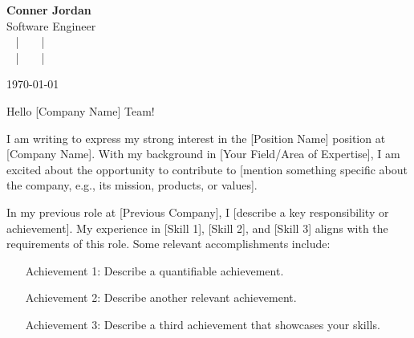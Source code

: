 \documentclass[letterpaper,11pt]{article}
\begin{document}
\begin{center}
  {\Huge \textbf{Conner Jordan}}\\[4pt]
  {\Large Software Engineer}\\[4pt]
  \href{tel:+18059759793}{
    \raisebox{-0.05\height}{\faPhone\ +1 (805) 975-9793}} ~ | ~
  \href{mailto:connercharlesjordan@gmail.com}{
    \raisebox{-0.15\height}{\faEnvelope\ connercharlesjordan@gmail.com}} ~ | ~
  \raisebox{-0.15\height}{\faMapMarker\ San Luis Obispo, CA} \\
  \href{https://www.linkedin.com/in/conner-jordan-4b268514a/}{
    \raisebox{-0.15\height}{\faLinkedin\ linkedin.com/in/conner-jordan-4b268514a}} ~ | ~
  \href{https://github.com/cjordan223}{
    \raisebox{-0.15\height}{\faGithub\ github.com/cjordan223}} ~ | ~
  \href{https://connerjordan.com/}{
    \raisebox{-0.15\height}{\faGlobe\ connerjordan.com}}
\end{center}

\vspace{16pt}

\begin{flushright}
\today
\end{flushright}


\vspace{26pt}

\noindent
Hello [Company Name] Team!

\vspace{16pt}

I am writing to express my strong interest in the [Position Name] position at [Company Name]. With my background in [Your Field/Area of Expertise], I am excited about the opportunity to contribute to [mention something specific about the company, e.g., its mission, products, or values].

\vspace{16pt}

In my previous role at [Previous Company], I [describe a key responsibility or achievement]. My experience in [Skill 1], [Skill 2], and [Skill 3] aligns with the requirements of this role. Some relevant accomplishments include:
\begin{itemize}
    \item [Achievement 1: Describe a quantifiable achievement.]
    \item [Achievement 2: Describe another relevant achievement.]
    \item [Achievement 3: Describe a third achievement that showcases your skills.]
\end{itemize}
\end{document}
